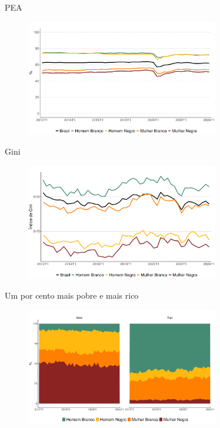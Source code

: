 \documentclass[10pt, xcolor=x11names,compress]{beamer}
\begin{document}
	\begin{frame}{PEA}
		\begin{figure}
			\centering
			\includegraphics[width = 0.75\textwidth]{figures_output/pea_br_gen_raca.pdf}
		\end{figure}
	\end{frame}	
	
	
	\begin{frame}{Gini}
		\begin{figure}
			\centering
			\includegraphics[width = 0.75\textwidth]{figures_output/gini_br_gen_raca.pdf}
		\end{figure}
	\end{frame}
	
	\begin{frame}{Um por cento mais pobre e mais rico}
		\begin{figure}
			\centering
			\includegraphics[width = 0.75\textwidth]{figures_output/base_topo_1.pdf}
		\end{figure}
	\end{frame}
	
\end{document}
